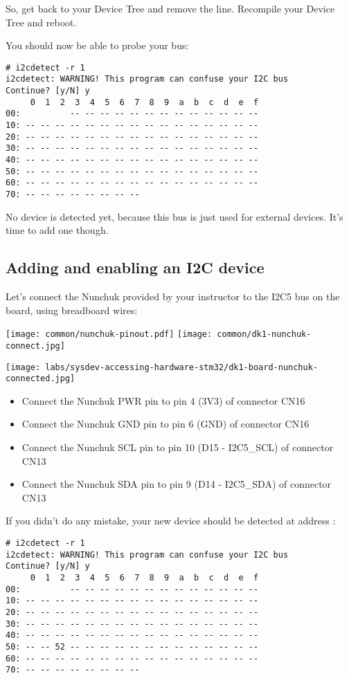 {So, get back to your Device Tree and remove the 
line. Recompile your Device Tree and reboot.

You should now be able to probe your bus:

\begin{verbatim}
# i2cdetect -r 1
i2cdetect: WARNING! This program can confuse your I2C bus
Continue? [y/N] y
     0  1  2  3  4  5  6  7  8  9  a  b  c  d  e  f
00:          -- -- -- -- -- -- -- -- -- -- -- -- --
10: -- -- -- -- -- -- -- -- -- -- -- -- -- -- -- --
20: -- -- -- -- -- -- -- -- -- -- -- -- -- -- -- --
30: -- -- -- -- -- -- -- -- -- -- -- -- -- -- -- --
40: -- -- -- -- -- -- -- -- -- -- -- -- -- -- -- --
50: -- -- -- -- -- -- -- -- -- -- -- -- -- -- -- --
60: -- -- -- -- -- -- -- -- -- -- -- -- -- -- -- --
70: -- -- -- -- -- -- -- --
\end{verbatim}

No device is detected yet, because this bus is just
used for external devices. It's time to add one though.

\subsection{Adding and enabling an I2C device}

Let's connect the Nunchuk provided by your instructor
to the I2C5 bus on the board, using breadboard wires:

\texttt{[image: common/nunchuk-pinout.pdf]}
\texttt{[image: common/dk1-nunchuk-connect.jpg]}
\begin{center}
\texttt{[image: labs/sysdev-accessing-hardware-stm32/dk1-board-nunchuk-connected.jpg]}
\end{center}

\begin{itemize}
\item Connect the Nunchuk PWR pin to pin 4 (3V3) of connector CN16
\item Connect the Nunchuk GND pin to pin 6 (GND) of connector CN16
\item Connect the Nunchuk SCL pin to pin 10 (D15 - I2C5\_SCL) of connector CN13
\item Connect the Nunchuk SDA pin to pin 9 (D14 - I2C5\_SDA) of connector CN13
\end{itemize}

If you didn't do any mistake, your new device should be detected at
address :

\begin{verbatim}
# i2cdetect -r 1
i2cdetect: WARNING! This program can confuse your I2C bus
Continue? [y/N] y
     0  1  2  3  4  5  6  7  8  9  a  b  c  d  e  f
00:          -- -- -- -- -- -- -- -- -- -- -- -- --
10: -- -- -- -- -- -- -- -- -- -- -- -- -- -- -- --
20: -- -- -- -- -- -- -- -- -- -- -- -- -- -- -- --
30: -- -- -- -- -- -- -- -- -- -- -- -- -- -- -- --
40: -- -- -- -- -- -- -- -- -- -- -- -- -- -- -- --
50: -- -- 52 -- -- -- -- -- -- -- -- -- -- -- -- --
60: -- -- -- -- -- -- -- -- -- -- -- -- -- -- -- --
70: -- -- -- -- -- -- -- --
\end{verbatim}

}
